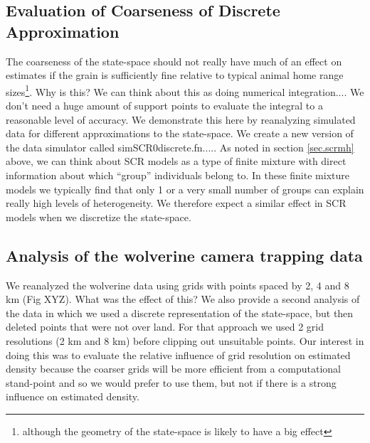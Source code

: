 \subsection{Evaluation of Coarseness of Discrete Approximation}
The coarseness of the state-space should not really have much of an effect on estimates if the grain is sufficiently fine relative to typical animal home range sizes\footnote{ although the geometry of the state-space is likely to have a big effect}. Why is this? We can think about this as doing numerical integration.... We don't need a huge amount of support points to evaluate the integral to a reasonable level of accuracy. We demonstrate this here by reanalyzing simulated data for different approximations to the state-space. We create a new version of the data simulator called simSCR0discrete.fn.....
As noted in section \ref{sec.scrmh} above, we can think about SCR
models as a type of finite mixture \citep{norris_pollock:1996,
  pledger:2000} with direct information about which ``group'' individuals belong to. In these finite mixture models we typically find that only 1 or a very small number of groups can explain really high levels of heterogeneity. We therefore expect a similar effect in SCR models when we discretize the state-space. 


\subsection{Analysis of the wolverine camera trapping data}

We reanalyzed the wolverine data using grids with points spaced by 2, 4 and 8 km (Fig XYZ). What was the effect of this?
We also provide a second analysis of the data in which we used a discrete representation of the state-space, but then deleted points that were not over land. For that approach we used 2 grid resolutions (2 km and 8 km) before clipping out unsuitable points. Our interest in doing this was to evaluate the relative influence of grid resolution on estimated density because the coarser grids will be more efficient from a computational stand-point and so we would prefer to use them, but not if there is a strong influence on estimated density.  


